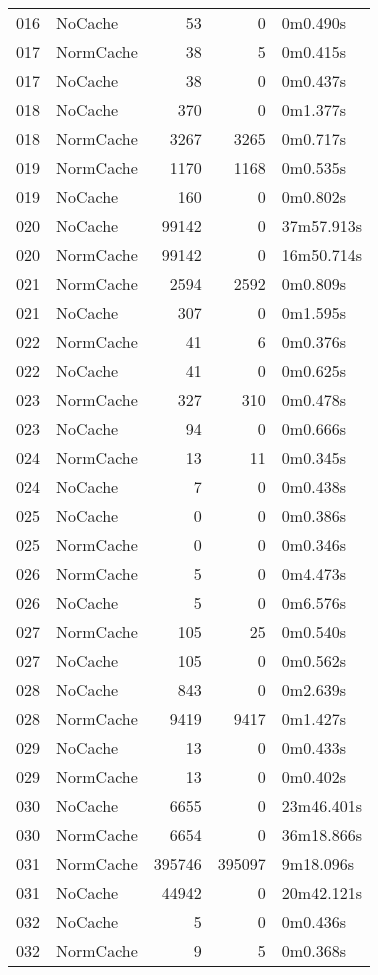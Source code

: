 \begin{tabular}{llrrl}
016 & NoCache & 53 & 0 & 0m0.490s \\
017 & NormCache & 38 & 5 & 0m0.415s \\
017 & NoCache & 38 & 0 & 0m0.437s \\
018 & NoCache & 370 & 0 & 0m1.377s \\
018 & NormCache & 3267 & 3265 & 0m0.717s \\
019 & NormCache & 1170 & 1168 & 0m0.535s \\
019 & NoCache & 160 & 0 & 0m0.802s \\
020 & NoCache & 99142 & 0 & 37m57.913s \\
020 & NormCache & 99142 & 0 & 16m50.714s \\
021 & NormCache & 2594 & 2592 & 0m0.809s \\
021 & NoCache & 307 & 0 & 0m1.595s \\
022 & NormCache & 41 & 6 & 0m0.376s \\
022 & NoCache & 41 & 0 & 0m0.625s \\
023 & NormCache & 327 & 310 & 0m0.478s \\
023 & NoCache & 94 & 0 & 0m0.666s \\
024 & NormCache & 13 & 11 & 0m0.345s \\
024 & NoCache & 7 & 0 & 0m0.438s \\
025 & NoCache & 0 & 0 & 0m0.386s \\
025 & NormCache & 0 & 0 & 0m0.346s \\
026 & NormCache & 5 & 0 & 0m4.473s \\
026 & NoCache & 5 & 0 & 0m6.576s \\
027 & NormCache & 105 & 25 & 0m0.540s \\
027 & NoCache & 105 & 0 & 0m0.562s \\
028 & NoCache & 843 & 0 & 0m2.639s \\
028 & NormCache & 9419 & 9417 & 0m1.427s \\
029 & NoCache & 13 & 0 & 0m0.433s \\
029 & NormCache & 13 & 0 & 0m0.402s \\
030 & NoCache & 6655 & 0 & 23m46.401s \\
030 & NormCache & 6654 & 0 & 36m18.866s \\
031 & NormCache & 395746 & 395097 & 9m18.096s \\
031 & NoCache & 44942 & 0 & 20m42.121s \\
032 & NoCache & 5 & 0 & 0m0.436s \\
032 & NormCache & 9 & 5 & 0m0.368s \\

\end{tabular}
